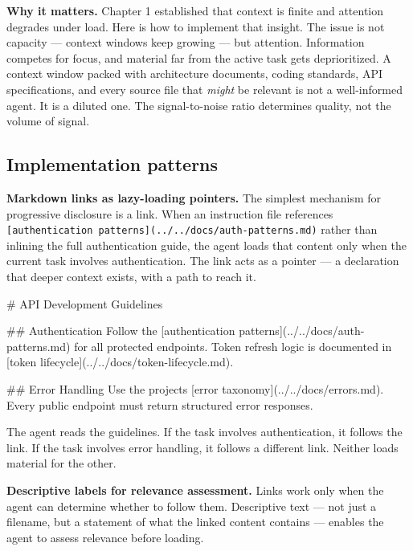 \documentclass[
  a4paper,
  DIV=11,
  numbers=noendperiod]{scrreprt}
\newenvironment{Shaded}{\begin{snugshade}}{\end{snugshade}}
\newcommand{\CommentTok}[1]{\textcolor[rgb]{0.37,0.37,0.37}{#1}}
\newcommand{\FunctionTok}[1]{\textcolor[rgb]{0.28,0.35,0.67}{#1}}
\newcommand{\NormalTok}[1]{\textcolor[rgb]{0.00,0.23,0.31}{#1}}
\newcommand{\OtherTok}[1]{\textcolor[rgb]{0.00,0.23,0.31}{#1}}
\begin{document}
\textbf{Why it matters.} Chapter 1 established that context is finite
and attention degrades under load. Here is how to implement that
insight. The issue is not capacity --- context windows keep growing ---
but attention. Information competes for focus, and material far from the
active task gets deprioritized. A context window packed with
architecture documents, coding standards, API specifications, and every
source file that \emph{might} be relevant is not a well-informed agent.
It is a diluted one. The signal-to-noise ratio determines quality, not
the volume of signal.

\subsection{Implementation patterns}\label{implementation-patterns}

\textbf{Markdown links as lazy-loading pointers.} The simplest mechanism
for progressive disclosure is a link. When an instruction file
references
\texttt{{[}authentication\ patterns{]}(../../docs/auth-patterns.md)}
rather than inlining the full authentication guide, the agent loads that
content only when the current task involves authentication. The link
acts as a pointer --- a declaration that deeper context exists, with a
path to reach it.

\begin{Shaded}
\begin{Highlighting}[]
\FunctionTok{\# API Development Guidelines}

\FunctionTok{\#\# Authentication}
\NormalTok{Follow the }\CommentTok{[}\OtherTok{authentication patterns}\CommentTok{](../../docs/auth{-}patterns.md)}\NormalTok{ for all}
\NormalTok{protected endpoints. Token refresh logic is documented in}
\CommentTok{[}\OtherTok{token lifecycle}\CommentTok{](../../docs/token{-}lifecycle.md)}\NormalTok{.}

\FunctionTok{\#\# Error Handling}
\NormalTok{Use the project\textquotesingle{}s }\CommentTok{[}\OtherTok{error taxonomy}\CommentTok{](../../docs/errors.md)}\NormalTok{. Every public}
\NormalTok{endpoint must return structured error responses.}
\end{Highlighting}
\end{Shaded}

The agent reads the guidelines. If the task involves authentication, it
follows the link. If the task involves error handling, it follows a
different link. Neither loads material for the other.

\textbf{Descriptive labels for relevance assessment.} Links work only
when the agent can determine whether to follow them. Descriptive text
--- not just a filename, but a statement of what the linked content
contains --- enables the agent to assess relevance before loading.
\end{document}
